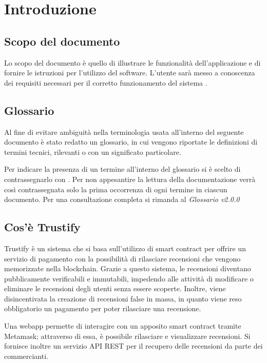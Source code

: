 \section{Introduzione}

\subsection{Scopo del documento}
Lo scopo del documento è quello di illustrare le funzionalità dell'applicazione e di fornire le istruzioni per l'utilizzo del software. L'utente sarà messo a conoscenza dei requisiti necessari per il corretto funzionamento del sistema \capName.

\subsection{Glossario}
Al fine di evitare ambiguità nella terminologia usata all'interno del seguente
documento è stato redatto un glossario, in cui vengono riportate le definizioni
di termini tecnici, rilevanti o con un significato particolare.

Per indicare
la presenza di un termine all'interno del glossario si è scelto di
contrassegnarlo con \glo . Per non appesantire la lettura della documentazione
verrà così contrassegnata solo la prima occorrenza di ogni termine in ciascun
documento.
Per una consultazione completa si rimanda al \textit{Glossario v2.0.0}

\subsection{Cos'è Trustify}
Trustify è un sistema che si basa sull'utilizzo di smart contract per offrire un servizio di pagamento con la possibilità di rilasciare recensioni che vengono memorizzate nella blockchain. Grazie a questo sistema, le recensioni diventano pubblicamente verificabili e immutabili, impedendo alle attività di modificare o eliminare le recensioni degli utenti senza essere scoperte. Inoltre, viene disincentivata la creazione di recensioni false in massa, in quanto viene reso obbligatorio un pagamento per poter rilasciare una recensione.

Una webapp permette di interagire con un apposito smart contract tramite Metamask; attraverso di essa, è possibile rilasciare e visualizzare recensioni. Si fornisce inoltre un servizio API REST per il recupero delle recensioni da parte dei commercianti.